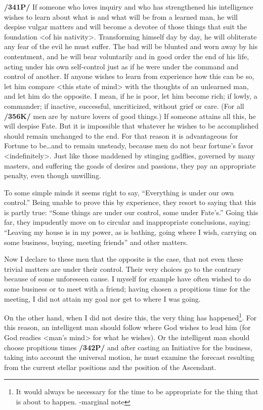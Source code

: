 \textbf{/341P/} If someone who loves inquiry and who has strengthened his intelligence wishes to learn about what is and what will be from a learned man, he will despise vulgar matters and will become a devotee of those things that suit the foundation <of his nativity>. Transforming himself day by day, he will obliterate any fear of the evil he must suffer. The bad will be blunted and worn away by his contentment, and he will bear voluntarily and in good order the end of his life, acting under his own self-control just as if he were under the command and control of another. If anyone wishes to learn from experience how this can be so, let him compare <this state of mind> with the thoughts of an unlearned man, and let him do the opposite.
I mean, if he is poor, let him become rich; if lowly, a commander; if inactive, successful, uncriticized, without grief or care. (For all \textbf{/356K/} men are by nature lovers of good things.) If someone attains all this, he will despise Fate. But it is impossible that whatever he wishes to be accomplished should remain unchanged to the end. For that reason it is advantageous for Fortune to be…and to remain unsteady,
because men do not bear fortune’s favor <indefinitely>. Just like those maddened by stinging gadflies, governed by many masters, and suffering the goads of desires and passions, they pay an appropriate penalty, even though unwilling.

To some simple minds it seems right to say, “Everything is under our own control.” Being unable to prove this by experience, they resort to saying that this is partly true: “Some things are under our control,
some under Fate’s.” Going this far, they impudently move on to circular and inappropriate conclusions, saying: “Leaving my house is in my power, as is bathing, going where I wish, carrying on some business,
buying, meeting friends” and other matters. 

Now I declare to these men that the opposite is the case, that not even these trivial matters are under their control. Their very choices go to the contrary because of some unforeseen cause. I myself for example have often wished to do some business or to meet with a friend; having chosen a propitious time for the meeting, I did not attain my goal nor get to where I was going.

On the other hand, when I did not desire this, the very thing has happened\footnote{It would always be necessary for the time to be appropriate for the thing that is about to happen. -marginal note}. For this reason, an intelligent man should follow where God wishes to lead him (for God readies <man’s mind> for what he wishes). Or the intelligent man should choose propitious times \textbf{/342P/} and after casting an Initiative for the business, taking into account the universal motion, he must examine the forecast resulting from the current stellar positions and the position of the Ascendant.
 
\newpage